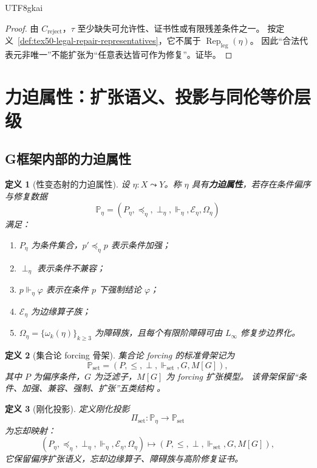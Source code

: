 \documentclass[12pt]{article}
\newtheorem{definition}{定义}[section]
\newcommand{\Linfty}{\ensuremath{L_\infty}}
\newcommand{\Rep}{\operatorname{Rep}}
\begin{document}
\begin{CJK*}{UTF8}{gkai}
\begin{proof}
由 $C_{\mathrm{reject}}$，$\tau$ 至少缺失可允许性、证书性或有限残差条件之一。
按定义~\ref{def:tex50-legal-repair-representatives}，它不属于 $\Rep_{\mathrm{leg}}(\eta)$。
因此“合法代表元非唯一”不能扩张为“任意表达皆可作为修复”。证毕。
\end{proof}

\clearpage

\section{力迫属性：扩张语义、投影与同伦等价层级}
\label{sec:tex50-forcing}

\subsection{G框架内部的力迫属性}
\label{subsec:tex50-forcing-property}

\begin{definition}[性变态射的力迫属性]
设 $\eta:X\leadsto Y$。称 $\eta$ 具有\textbf{力迫属性}，若存在条件偏序与修复数据
\[
  \mathbb P_\eta=(P_\eta,\preceq_\eta,\perp_\eta,\Vdash_\eta,\mathcal E_\eta,\Omega_\eta)
\]
满足：
\begin{enumerate}
  \item $P_\eta$ 为条件集合，$p'\preceq_\eta p$ 表示条件加强；
  \item $\perp_\eta$ 表示条件不兼容；
  \item $p\Vdash_\eta \varphi$ 表示在条件 $p$ 下强制结论 $\varphi$；
  \item $\mathcal E_\eta$ 为边缘算子族；
  \item $\Omega_\eta=\{\omega_k(\eta)\}_{k\ge3}$ 为障碍族，且每个有限阶障碍可由 \Linfty{} 修复步边界化。
\end{enumerate}
\end{definition}

\begin{definition}[集合论 forcing 骨架]
集合论 forcing 的标准骨架记为
\[
  \mathbb P_{\mathrm{set}}
  =
  (P,\le,\perp,\Vdash_{\mathrm{set}},G,M[G]),
\]
其中 $P$ 为偏序条件，$G$ 为泛滤子，$M[G]$ 为 forcing 扩张模型。
该骨架保留“条件、加强、兼容、强制、扩张”五类结构 \cite{Cohen1963,Jech2003,SEPSetTheory,EOMForcing}。
\end{definition}

\begin{definition}[刚化投影]
定义刚化投影
\[
  \Pi_{\mathrm{set}}:
  \mathbb P_\eta\to\mathbb P_{\mathrm{set}}
\]
为忘却映射：
\[
  (P_\eta,\preceq_\eta,\perp_\eta,\Vdash_\eta,\mathcal E_\eta,\Omega_\eta)
  \mapsto
  (P,\le,\perp,\Vdash_{\mathrm{set}},G,M[G]),
\]
它保留偏序扩张语义，忘却边缘算子、障碍族与高阶修复证书。
\end{definition}


\end{CJK*}
\end{document}
